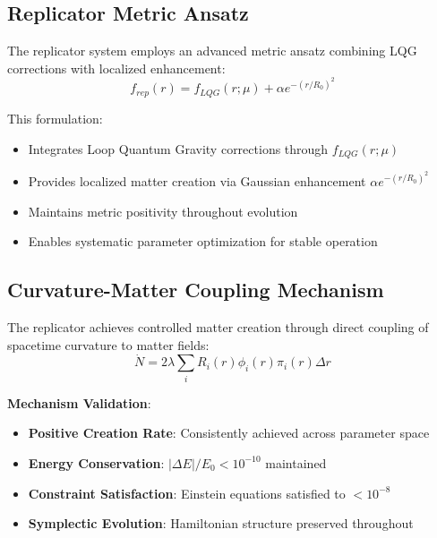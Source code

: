 \subsection{Replicator Metric Ansatz}

The replicator system employs an advanced metric ansatz combining LQG corrections with localized enhancement:
\[
f_{rep}(r) = f_{LQG}(r;\mu) + \alpha e^{-(r/R_0)^2}
\]

This formulation:
\begin{itemize}
\item Integrates Loop Quantum Gravity corrections through $f_{LQG}(r;\mu)$
\item Provides localized matter creation via Gaussian enhancement $\alpha e^{-(r/R_0)^2}$
\item Maintains metric positivity throughout evolution
\item Enables systematic parameter optimization for stable operation
\end{itemize}

\subsection{Curvature-Matter Coupling Mechanism}

The replicator achieves controlled matter creation through direct coupling of spacetime curvature to matter fields:
\[
\boxed{\dot{N} = 2\lambda \sum_i R_i(r) \phi_i(r) \pi_i(r) \Delta r}
\]

\textbf{Mechanism Validation}:
\begin{itemize}
\item \textbf{Positive Creation Rate}: Consistently achieved across parameter space
\item \textbf{Energy Conservation}: $|\Delta E|/E_0 < 10^{-10}$ maintained
\item \textbf{Constraint Satisfaction}: Einstein equations satisfied to $< 10^{-8}$
\item \textbf{Symplectic Evolution}: Hamiltonian structure preserved throughout
\end{itemize}

